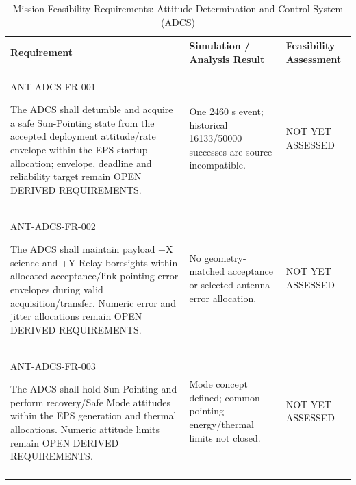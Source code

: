 \begin{table}[H]\centering\small\setlength{\tabcolsep}{3pt}
\caption{Mission Feasibility Requirements: Attitude Determination and Control System (ADCS)}\label{tab:fr-adcs}
\begin{tabular}{@{}
>{\RaggedRight\arraybackslash}p{}
>{\RaggedRight\arraybackslash}p{}
>{\RaggedRight\arraybackslash}p{}
@{}}
\toprule Requirement & Simulation / Analysis Result & Feasibility Assessment\\\midrule
{}\label{req:ANT-ADCS-FR-001}\mbox{ANT-ADCS-}\newline\mbox{FR-001}\par The ADCS shall detumble and acquire a safe Sun-Pointing state from the accepted deployment attitude/rate envelope within the EPS startup allocation; envelope, deadline and reliability target remain OPEN DERIVED REQUIREMENTS. & One 2460 s event; historical 16133/50000 successes are source-incompatible. & NOT YET ASSESSED\\
\addlinespace[3pt]
\label{req:ANT-ADCS-FR-002}\mbox{ANT-ADCS-}\newline\mbox{FR-002}\par The ADCS shall maintain payload +X science and +Y Relay boresights within allocated acceptance/link pointing-error envelopes during valid acquisition/transfer. Numeric error and jitter allocations remain OPEN DERIVED REQUIREMENTS. & No geometry-matched acceptance or selected-antenna error allocation. & NOT YET ASSESSED\\
\addlinespace[3pt]
\label{req:ANT-ADCS-FR-003}\mbox{ANT-ADCS-}\newline\mbox{FR-003}\par The ADCS shall hold Sun Pointing and perform recovery/Safe Mode attitudes within the EPS generation and thermal allocations. Numeric attitude limits remain OPEN DERIVED REQUIREMENTS. & Mode concept defined; common pointing-energy/thermal limits not closed. & NOT YET ASSESSED\\
\addlinespace[3pt]
\bottomrule
\end{tabular}
\end{table}
